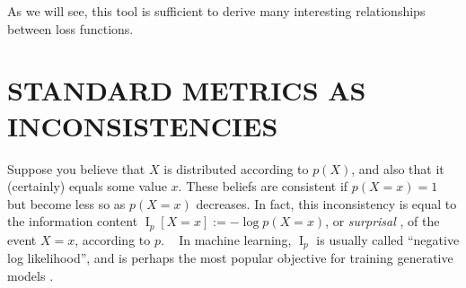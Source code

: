 \documentclass[twoside]{article}
\theoremstyle{plain}
\theoremstyle{definition}
\DeclareMathOperator{\I}{\mathrm{I}} %
\newcommand{\mat}[1]{\mathbf{#1}}
\begin{document}
As we will see, this tool is sufficient to derive many interesting relationships between loss functions.
\section{STANDARD METRICS AS INCONSISTENCIES}

\def\xsamp{{\mathcal D}}
\def\xysamp{{\mathcal D}}

Suppose you believe that $X$ is distributed according to $p(X)$,
and also that it (certainly) equals some value $x$. These beliefs are consistent if $p(X\!\!=\!x) =\! 1$
but become less so
 as $p(X\!\!=\!x)$ decreases.
In fact, this inconsistency
is equal to
the
information content  $\I_p[X\!\!=\!x] := -\log p(X\!\!=\!x)$, or \emph{surprisal} \parencite{tribus1961information}, of the event $X \!\!=\! x$,
according to $p$.%
\footnotemark\
In machine learning, $\I_p$ is usually called ``negative log
likelihood'', and is perhaps the most popular objective for training
generative models
\parencite{deepgennotes,myung2003tutorial}.%
\end{document}
